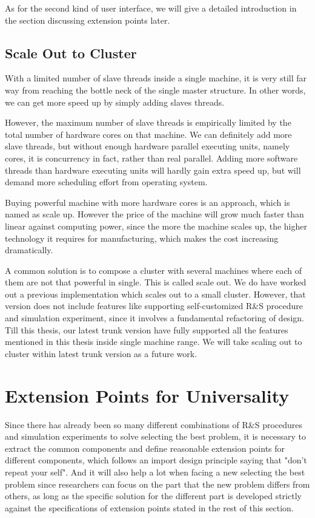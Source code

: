 \documentclass[12pt,a4]{report}
\begin{document}
As for the second kind of user interface, we will give a detailed introduction in the section discussing extension points later.

\subsection{Scale Out to Cluster}

With a limited number of slave threads inside a single machine, it is very still far way from reaching the bottle neck of the single master structure. In other words, we can get more speed up by simply adding slaves threads.

However, the maximum number of slave threads is empirically limited by the total number of hardware cores on that machine. We can definitely add more slave threads, but without enough hardware parallel executing units, namely cores, it is concurrency in fact, rather than real parallel. Adding more software threads than hardware executing units will hardly gain extra speed up, but will demand more scheduling effort from operating system.

Buying powerful machine with more hardware cores is an approach, which is named as scale up. However the price of the machine will grow much faster than linear against computing power, since the more the machine scales up, the higher technology it requires for manufacturing, which makes the cost increasing dramatically.

A common solution is to compose a cluster with several machines where each of them are not that powerful in single. This is called scale out. We do have worked out a previous implementation which scales out to a small cluster. However, that version does not include features like supporting self-customized R\&S procedure and simulation experiment, since it involves a fundamental refactoring of design. Till this thesis, our latest trunk version have fully supported all the features mentioned in this thesis inside single machine range. We will take scaling out to cluster within latest trunk version as a future work.

\section{Extension Points for Universality}

Since there has already been so many different combinations of R\&S procedures and simulation experiments to solve selecting the best problem, it is necessary to extract the common components and define reasonable extension points for different components, which follows an import design principle saying that "don't repeat your self". And it will also help a lot when facing a new selecting the best problem since researchers can focus on the part that the new problem differs from others, as long as the specific solution for the different part is developed strictly against the specifications of extension points stated in the rest of this section.
\end{document}
